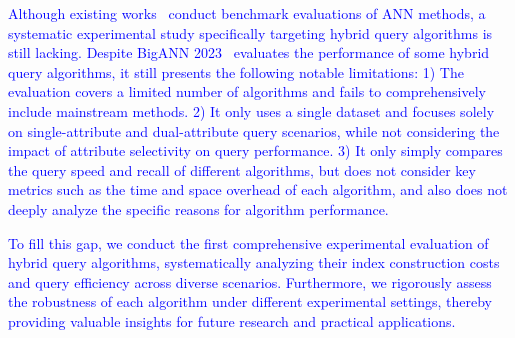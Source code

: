 \documentclass[sigconf, nonacm]{acmart}
\begin{document}
	\textcolor{blue}{Although existing works~\cite{compare,azizi2025graph} conduct benchmark evaluations of ANN methods, a systematic experimental study specifically targeting hybrid query algorithms is still lacking. Despite BigANN 2023~\cite{bigann2023} evaluates the performance of some hybrid query algorithms, it still presents the following notable limitations:
	1) The evaluation covers a limited number of algorithms and fails to comprehensively include mainstream methods.
	2) It only uses a single dataset and focuses solely on single-attribute and dual-attribute query scenarios, while not considering the impact of attribute selectivity on query performance.
	3) It only simply compares the query speed and recall of different algorithms, but does not consider key metrics such as the time and space overhead of each algorithm, and also does not deeply analyze the specific reasons for algorithm performance.}
	
	\textcolor{blue}{To fill this gap, we conduct the first comprehensive experimental evaluation of hybrid query algorithms, systematically analyzing their index construction costs and query efficiency across diverse scenarios. Furthermore, we rigorously assess the robustness of each algorithm under different experimental settings, thereby providing valuable insights for future research and practical applications.}
	
\end{document}
